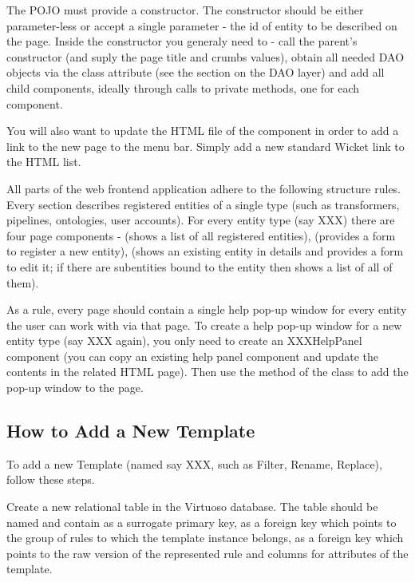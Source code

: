 The POJO must provide a constructor. The constructor should be either parameter-less or accept a single parameter - the id of entity to be described on the page. Inside the constructor you generaly need to - call the parent's constructor (and suply the page title and crumbs values), obtain all needed DAO objects via the  class attribute (see the section on the DAO layer) and add all child components, ideally through calls to private methods, one for each component.

You will also want to update the HTML file of the  component in order to add a link to the new page to the menu bar. Simply add a new standard Wicket link to the HTML list.

All parts of the web frontend application adhere to the following structure rules. Every section describes registered entities of a single type (such as transformers, pipelines, ontologies, user accounts). For every entity type (say XXX) there are four page components -  (shows a list of all registered entities),  (provides a form to register a new entity),  (shows an existing entity in details and provides a form to edit it; if there are subentities bound to the entity then shows a list of all of them).

As a rule, every page should contain a single help pop-up window for every entity the user can work with via that page. To create a help pop-up window for a new entity type (say XXX again), you only need to create an XXXHelpPanel component (you can copy an existing help panel component and update the contents in the related HTML page). Then use the  method of the  class to add the pop-up window to the page.


\subsection{How to Add a New \DN Template}

To add a new \DN Template (named say XXX, such as Filter, Rename, Replace), follow these steps.

Create a new relational table in the Virtuoso database. The table should be named  and contain  as a surrogate primary key,  as a foreign key which points to the group of rules to which the template instance belongs,  as a foreign key which points to the raw version of the represented rule and columns for attributes of the template.

